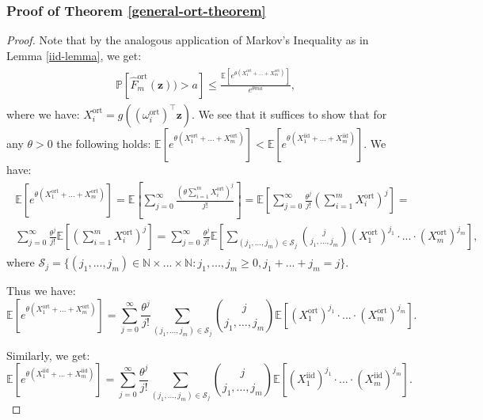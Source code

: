 \subsubsection{Proof of Theorem \ref{general-ort-theorem}}

\begin{proof}
Note that by the analogous application of Markov's Inequality as in Lemma \ref{iid-lemma}, we get:
\begin{align}
\begin{split}
\mathbb{P}[\widehat{F}^{\mathrm{ort}}_{m}(\mathbf{z})) > a] \leq   
\frac{\mathbb{E}[e^{\theta (X_{1}^{\mathrm{ort}}+...+X_{m}^{\mathrm{ort}})}]}{e^{\theta ma}},
\end{split}    
\end{align}
where we have:
$X_{i}^{\mathrm{ort}} = g((\omega_{i}^{\mathrm{ort}})^{\top}\mathbf{z})$.
We see that it suffices to show that for any $\theta > 0$ the following holds: 
$\mathbb{E}[e^{\theta (X_{1}^{\mathrm{ort}}+...+X_{m}^{\mathrm{ort}})}] < \mathbb{E}[e^{\theta (X_{1}^{\mathrm{iid}}+...+X_{m}^{\mathrm{iid}})}]$.
We have: 
\begin{align}
\begin{split}
\mathbb{E}[e^{\theta (X_{1}^{\mathrm{ort}}+...+X_{m}^{\mathrm{ort}})}] = \mathbb{E}[\sum_{j=0}^{\infty} \frac{(\theta \sum_{i=1}^{m} X_{i}^{\mathrm{ort}})^{j}}{j!}] 
= \mathbb{E}[\sum_{j=0}^{\infty}\frac{\theta^{j}}{j!}(\sum_{i=1}^{m}X^{\mathrm{ort}}_{i})^{j}]=\\
\sum_{j=0}^{\infty}\frac{\theta^{j}}{j!} \mathbb{E}[(\sum_{i=1}^{m} X^{\mathrm{ort}}_{i})^{j}]=
\sum_{j=0}^{\infty}\frac{\theta^{j}}{j!}
\mathbb{E}[\sum_{(j_{1},...,j_{m}) \in \mathcal{S}_{j}} \binom{j}{j_{1},\dots,j_{m}} (X_{1}^{\mathrm{ort}})^{j_{1}} \cdot ... \cdot (X_{m}^{\mathrm{ort}})^{j_{m}}],
\end{split}
\end{align}
where $\mathcal{S}_{j} = \{(j_{1},...,j_{m}) \in \mathbb{N} \times ...\times \mathbb{N}:j_{1},...,j_{m} \geq 0, j_{1}+...+j_{m}=j\}$.


Thus we have:
\begin{equation}
\mathbb{E}[e^{\theta (X_{1}^{\mathrm{ort}}+...+X_{m}^{\mathrm{ort}})}] = \sum_{j=0}^{\infty} \frac{\theta^{j}}{j!} \sum_{(j_{1},...,j_{m}) \in \mathcal{S}_{j}} \binom{j}{j_{1},\dots,j_{m}} \mathbb{E}[(X_{1}^{\mathrm{ort}})^{j_{1}} \cdot ... \cdot (X_{m}^{\mathrm{ort}})^{j_{m}}].  
\end{equation}

Similarly, we get:
\begin{equation}
\mathbb{E}[e^{\theta (X_{1}^{\mathrm{iid}}+...+X_{m}^{\mathrm{iid}})}] = \sum_{j=0}^{\infty} \frac{\theta^{j}}{j!} \sum_{(j_{1},...,j_{m}) \in \mathcal{S}_{j}} \binom{j}{j_{1},\dots,j_{m}} \mathbb{E}[(X_{1}^{\mathrm{iid}})^{j_{1}} \cdot ... \cdot (X_{m}^{\mathrm{iid}})^{j_{m}}].    
\end{equation}


\end{proof}
